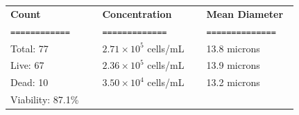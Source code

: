 \documentclass[UTF8,10pt,a4paper,fontset=fandol]{ctexart}
\renewcommand{\arraystretch}{1.15}
\newcommand{\fieldvalue}[1]{#1}
\begin{document}
\renewcommand{\arraystretch}{1.15}
\begin{tabular}{@{}p{0.30\linewidth}p{0.34\linewidth}p{0.30\linewidth}@{}}
\textbf{Count} & \textbf{Concentration} & \textbf{Mean Diameter} \\
\texttt{============} & \texttt{=============} & \texttt{==============} \\[0.2em]

Total:
\fieldvalue{77}
&
\fieldvalue{$2.71\times10^{5}$ cells/mL}
&
\fieldvalue{13.8 microns}
\\

Live:
\fieldvalue{67}
&
\fieldvalue{$2.36\times10^{5}$ cells/mL}
&
\fieldvalue{13.9 microns}
\\

Dead:
\fieldvalue{10}
&
\fieldvalue{$3.50\times10^{4}$ cells/mL}
&
\fieldvalue{13.2 microns}
\\

Viability:
\fieldvalue{87.1\%}
&
&
\end{tabular}

\vspace{1.4em}

\noindent
\hfill

\vspace{0.8em}

\noindent
\hfill
\end{document}
